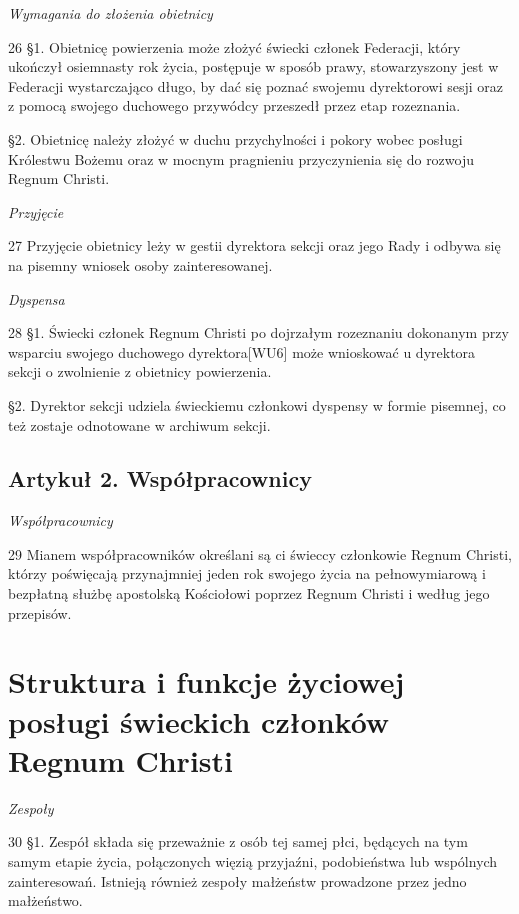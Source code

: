 ﻿\documentclass{report}
\newcommand{\lett}[1]{\lettrine[findent=6pt]{#1}{}}
\newcommand{\ssec}[1]{\vspace{1em}\textit{#1}\vspace{.5em}\nopagebreak}
\begin{document}
\ssec{Wymagania do złożenia obietnicy}


\lett{26} \S{}1. Obietnicę powierzenia może złożyć świecki członek Federacji, który ukończył osiemnasty rok życia, postępuje w sposób prawy, stowarzyszony jest w Federacji wystarczająco długo, by dać się poznać swojemu dyrektorowi sesji oraz z pomocą swojego duchowego przywódcy przeszedł przez etap rozeznania.


\S{}2. Obietnicę należy złożyć w duchu przychylności i pokory wobec posługi Królestwu Bożemu oraz w mocnym pragnieniu przyczynienia się do rozwoju Regnum Christi.
 
\ssec{Przyjęcie}


\lett{27} Przyjęcie obietnicy leży w gestii dyrektora sekcji oraz jego Rady i odbywa się na pisemny wniosek osoby zainteresowanej.
 


\ssec{Dyspensa}


\lett{28} \S{}1. Świecki członek Regnum Christi po dojrzałym rozeznaniu dokonanym przy wsparciu swojego duchowego dyrektora[WU6]  może wnioskować u dyrektora sekcji o zwolnienie z obietnicy powierzenia.


\S{}2. Dyrektor sekcji udziela świeckiemu członkowi dyspensy w formie pisemnej, co też zostaje odnotowane w archiwum sekcji.


\section{Artykuł 2. Współpracownicy}
 
\ssec{Współpracownicy}


\lett{29} Mianem współpracowników określani są ci świeccy członkowie Regnum Christi, którzy poświęcają przynajmniej jeden rok swojego życia na pełnowymiarową i bezpłatną służbę apostolską Kościołowi poprzez Regnum Christi i według jego przepisów.


\chapter{Struktura i funkcje życiowej posługi świeckich członków Regnum Christi}


\ssec{Zespoły}


\lett{30} \S{}1. Zespół składa się przeważnie z osób tej samej płci, będących na tym samym etapie życia, połączonych więzią przyjaźni, podobieństwa lub wspólnych zainteresowań. Istnieją również zespoły małżeństw prowadzone przez jedno małżeństwo.
\end{document}
